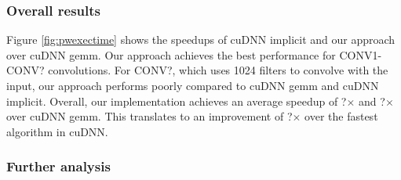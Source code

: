 \subsubsection{Overall results} Figure \ref{fig:pwexectime} shows the speedups of cuDNN implicit and our approach over cuDNN gemm.
Our approach achieves the best performance for CONV1-CONV? convolutions.
For CONV?, which uses 1024 filters to convolve with the input, our approach performs poorly compared to cuDNN gemm and cuDNN implicit.
Overall, our implementation achieves an average speedup of ?$\times$ and ?$\times$ over cuDNN gemm. 
This translates to an improvement of ?$\times$ over the fastest algorithm in cuDNN.

\subsubsection{Further analysis}
